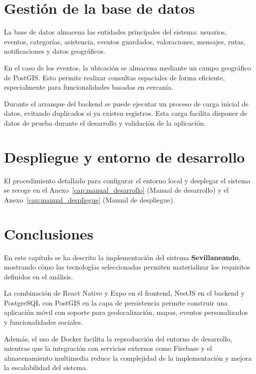 \section{Gestión de la base de datos}

La base de datos almacena las entidades principales del sistema: usuarios, eventos, categorías, asistencia, eventos guardados, valoraciones, mensajes, rutas, notificaciones y datos geográficos.

En el caso de los eventos, la ubicación se almacena mediante un campo geográfico de PostGIS. Esto permite realizar consultas espaciales de forma eficiente, especialmente para funcionalidades basadas en cercanía.

Durante el arranque del backend se puede ejecutar un proceso de carga inicial de datos, evitando duplicados si ya existen registros. Esta carga facilita disponer de datos de prueba durante el desarrollo y validación de la aplicación.

\section{Despliegue y entorno de desarrollo}

El procedimiento detallado para configurar el entorno local y desplegar el sistema se recoge en el Anexo~\ref{cap:manual_desarrollo} (Manual de desarrollo) y el Anexo~\ref{cap:manual_despliegue} (Manual de despliegue).

\section{Conclusiones}

En este capítulo se ha descrito la implementación del sistema \textbf{Sevillaneando}, mostrando cómo las tecnologías seleccionadas permiten materializar los requisitos definidos en el análisis.

La combinación de React Native y Expo en el frontend, NestJS en el backend y PostgreSQL con PostGIS en la capa de persistencia permite construir una aplicación móvil con soporte para geolocalización, mapas, eventos personalizados y funcionalidades sociales.

Además, el uso de Docker facilita la reproducción del entorno de desarrollo, mientras que la integración con servicios externos como Firebase y el almacenamiento multimedia reduce la complejidad de la implementación y mejora la escalabilidad del sistema.

